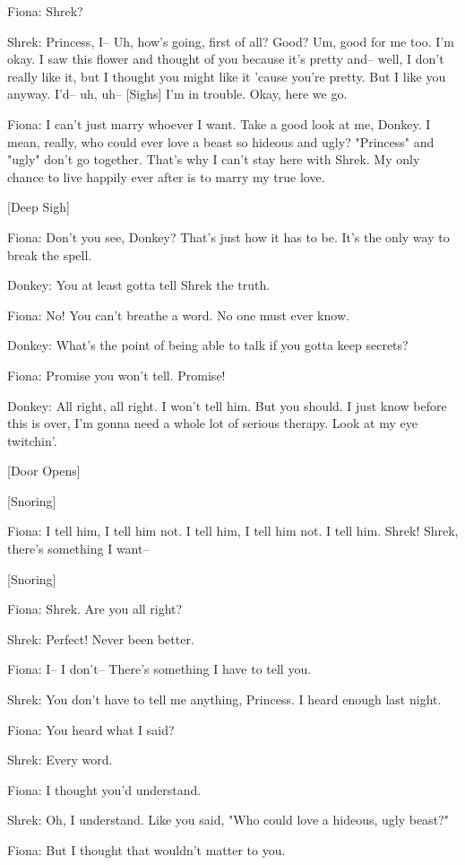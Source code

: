 \documentclass{article}
\begin{document}
Fiona:
Shrek?

Shrek:
Princess, I-- Uh, how's going, first of all? Good? Um, good for me too. I'm okay. I saw this flower and thought of you because it's pretty and-- well, I don't really like it, but I thought you might like it 'cause you're pretty. But I like you anyway. I'd-- uh, uh-- [Sighs] I'm in trouble. Okay, here we go.

Fiona:
I can't just marry whoever I want. Take a good look at me, Donkey. I mean, really, who could ever love a beast so hideous and ugly? "Princess" and "ugly" don't go together. That's why I can't stay here with Shrek. My only chance to live happily ever after is to marry my true love.

[Deep Sigh]

Fiona:
Don't you see, Donkey? That's just how it has to be. It's the only way to break the spell.

Donkey:
You at least gotta tell Shrek the truth.

Fiona:
No! You can't breathe a word. No one must ever know.

Donkey:
What's the point of being able to talk if you gotta keep secrets?

Fiona:
Promise you won't tell. Promise!

Donkey:
All right, all right. I won't tell him. But you should. I just know before this is over, I'm gonna need a whole lot of serious therapy. Look at my eye twitchin'.

[Door Opens]

[Snoring]

Fiona:
I tell him, I tell him not. I tell him, I tell him not. I tell him. Shrek! Shrek, there's something I want--

[Snoring]

Fiona:
Shrek. Are you all right?

Shrek:
Perfect! Never been better.

Fiona:
I-- I don't-- There's something I have to tell you.

Shrek:
You don't have to tell me anything, Princess. I heard enough last night.

Fiona:
You heard what I said?

Shrek:
Every word.

Fiona:
I thought you'd understand.

Shrek:
Oh, I understand. Like you said, "Who could love a hideous, ugly beast?"

Fiona:
But I thought that wouldn't matter to you.
\end{document}
